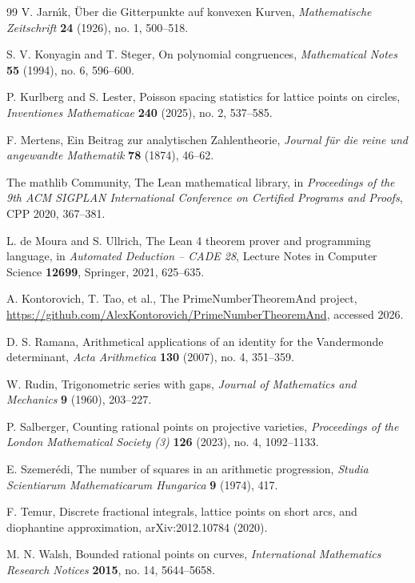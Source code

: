 \documentclass[11pt]{article}
\begin{document}
\begin{thebibliography}{99}
V. Jarn\'{\i}k,
\newblock \"Uber die Gitterpunkte auf konvexen Kurven,
\newblock \emph{Mathematische Zeitschrift} \textbf{24} (1926), no. 1,
500--518.

S. V. Konyagin and T. Steger,
\newblock On polynomial congruences,
\newblock \emph{Mathematical Notes} \textbf{55} (1994), no. 6, 596--600.

P. Kurlberg and S. Lester,
\newblock Poisson spacing statistics for lattice points on circles,
\newblock \emph{Inventiones Mathematicae} \textbf{240} (2025), no. 2,
537--585.

F. Mertens,
\newblock Ein Beitrag zur analytischen Zahlentheorie,
\newblock \emph{Journal f\"ur die reine und angewandte Mathematik} \textbf{78} (1874),
46--62.

The mathlib Community,
\newblock The Lean mathematical library,
\newblock in \emph{Proceedings of the 9th ACM SIGPLAN International Conference
on Certified Programs and Proofs}, CPP 2020, 367--381.

L. de Moura and S. Ullrich,
\newblock The Lean 4 theorem prover and programming language,
\newblock in \emph{Automated Deduction -- CADE 28}, Lecture Notes in Computer
Science \textbf{12699}, Springer, 2021, 625--635.

A. Kontorovich, T. Tao, et al.,
\newblock The PrimeNumberTheoremAnd project,
\newblock \url{https://github.com/AlexKontorovich/PrimeNumberTheoremAnd}, accessed 2026.

D. S. Ramana,
\newblock Arithmetical applications of an identity for the Vandermonde
determinant,
\newblock \emph{Acta Arithmetica} \textbf{130} (2007), no. 4, 351--359.

W. Rudin,
\newblock Trigonometric series with gaps,
\newblock \emph{Journal of Mathematics and Mechanics} \textbf{9} (1960),
203--227.

P. Salberger,
\newblock Counting rational points on projective varieties,
\newblock \emph{Proceedings of the London Mathematical Society (3)}
\textbf{126} (2023), no. 4, 1092--1133.

E. Szemer\'edi,
\newblock The number of squares in an arithmetic progression,
\newblock \emph{Studia Scientiarum Mathematicarum Hungarica} \textbf{9} (1974),
417.

F. Temur,
\newblock Discrete fractional integrals, lattice points on short arcs, and
diophantine approximation,
\newblock arXiv:2012.10784 (2020).

M. N. Walsh,
\newblock Bounded rational points on curves,
\newblock \emph{International Mathematics Research Notices} \textbf{2015},
no. 14, 5644--5658.

\end{thebibliography}
\end{document}
